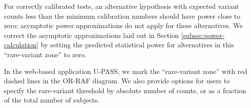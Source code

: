 For correctly calibrated tests, an alternative hypothesis with expected variant counts less than the minimum calibration numbers should have power close to zero; asymptotic power approximations do not apply for these alternatives.
We correct the asymptotic approximations laid out in Section \ref{subsec:power-calculation} by setting the predicted statistical power for alternatives in this ``rare-variant zone'' to zero.


In the web-based application U-PASS, we mark the ``rare-variant zone'' with red dashed lines in the OR-RAF diagram.
We also provide options for users to specify the rare-variant threshold by absolute number of counts, or as a fraction of the total number of subjects.

